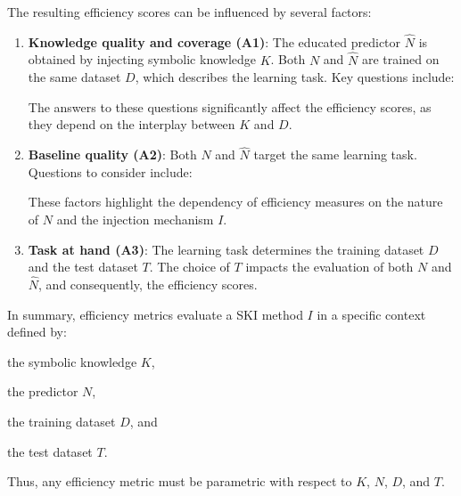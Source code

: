 The resulting efficiency scores can be influenced by several factors:
%
\begin{enumerate}
    \item \textbf{Knowledge quality and coverage (A1)}:
    The educated predictor \(\hat{N}\) is obtained by injecting symbolic knowledge \(K\).
    Both \(N\) and \(\hat{N}\) are trained on the same dataset \(D\), which describes the learning task.
    Key questions include:
    The answers to these questions significantly affect the efficiency scores, as they depend on the interplay between \(K\) and \(D\).

    \item \textbf{Baseline quality (A2)}:
    Both \(N\) and \(\hat{N}\) target the same learning task.
    Questions to consider include:
    These factors highlight the dependency of efficiency measures on the nature of \(N\) and the injection mechanism \(I\).

    \item \textbf{Task at hand (A3)}:
    The learning task determines the training dataset \(D\) and the test dataset \(T\).
    The choice of \(T\) impacts the evaluation of both \(N\) and \(\hat{N}\), and consequently, the efficiency scores.
\end{enumerate}

In summary, efficiency metrics evaluate a \gls{SKI} method \(I\) in a specific context defined by:
%
\begin{inlinelist}
    \item the symbolic knowledge \(K\),
    \item the predictor \(N\),
    \item the training dataset \(D\), and
    \item the test dataset \(T\).
\end{inlinelist}
%
Thus, any efficiency metric must be parametric with respect to \(K\), \(N\), \(D\), and \(T\).


